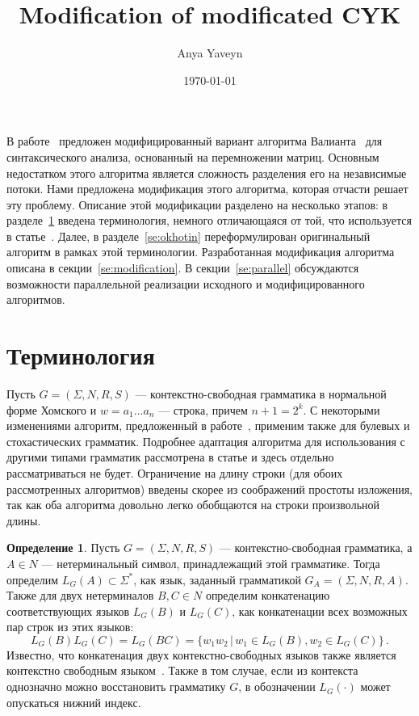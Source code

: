 \documentclass[a4paper,12pt]{article}  %
\title{Modification of modificated CYK}
\author{Anya Yaveyn}
\date{\today}
\theoremstyle{definition}
\newtheorem{definition}{Определение}[section]
\theoremstyle{remark}
\begin{document}
В работе~\cite{okhotin13} предложен модифицированный вариант алгоритма Валианта~\cite{valiant75} для синтаксического анализа, основанный на перемножении матриц. 
Основным недостатком этого алгоритма является сложность разделения его на независимые потоки. Нами предложена модификация этого алгоритма, которая отчасти решает эту проблему. Описание этой модификации разделено на несколько этапов: в разделе~\ref{se:term} введена терминология, немного отличающаяся от той, что используется в статье~\cite{okhotin13}. Далее, в разделе~\ref{se:okhotin} переформулирован оригинальный алгоритм в рамках этой терминологии. Разработанная модификация алгоритма описана в секции~\ref{se:modification}. В секции~\ref{se:parallel} обсуждаются возможности параллельной реализации исходного и модифицированного алгоритмов.



\section{Терминология}
\label{se:term}

Пусть $G=(\Sigma, N, R, S)$ --- контекстно-свободная грамматика в нормальной форме Хомского и $w = a_1 \dots a_{n}$ --- строка, причем $n + 1 = 2^k$. С некоторыми изменениями алгоритм, предложенный в работе~\cite{okhotin13}, применим также для булевых и стохастических грамматик. Подробнее адаптация алгоритма для использования с другими типами грамматик рассмотрена в статье \cite{okhotin13} и здесь отдельно рассматриваться не будет. Ограничение на длину строки (для обоих рассмотренных алгоритмов) введены скорее из соображений простоты изложения, так как оба алгоритма довольно легко обобщаются на строки произвольной длины. 

\begin{definition}
Пусть $G = (\Sigma, N, R, S)$ --- контекстно-свободная грамматика, а $A \in N$ --- нетерминальный символ, принадлежащий этой грамматике. Тогда определим $L_G(A) \subset \Sigma^\ast$, как язык, заданный грамматикой $G_A = (\Sigma, N, R, A)$. Также для двух нетерминалов $B,C \in N$ определим конкатенацию соответствующих языков $L_G(B)$ и $L_G(C)$, как конкатенации всех возможных пар строк из этих языков:
$$L_G(B)L_G(C) = L_G(BC) = \{w_1w_2\,|\, w_1 \in L_G(B), w_2 \in L_G(C)\}\,.$$ 
Известно, что конкатенация двух контекстно-свободных языков также является контекстно свободным языком~\cite{hopcroft07}. Также в том случае, если из контекста однозначно можно восстановить грамматику $G$, в обозначении $L_G(\cdot)$ может опускаться нижний индекс.
\end{definition}
\end{document}
